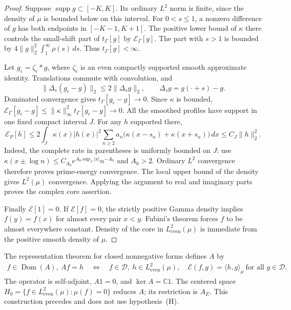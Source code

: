 \documentclass[11pt,a4paper]{article}
\numberwithin{equation}{section}
\theoremstyle{definition}
\theoremstyle{remark}
\newcommand{\C}{\mathbb C}
\newcommand{\E}{\mathcal E}
\newcommand{\D}{\mathcal D}
\newcommand{\He}{L^2_{\mathrm{even}}(\mu)}
\newcommand{\tg}{t_{\Gamma}}
\newcommand{\dom}{\operatorname{Dom}}
\newcommand{\supp}{\operatorname{supp}}
\newcommand{\ip}[2]{\langle #1,#2\rangle}
\newcommand{\norm}[1]{\lVert #1\rVert}
\begin{document}
\begin{proof}
Suppose $\supp g\subset[-K,K]$. Its ordinary $L^2$ norm is finite, since the density of $\mu$ is bounded below on this interval. For $0<s\le1$, a nonzero difference of $g$ has both endpoints in $[-K-1,K+1]$. The positive lower bound of $\kappa$ there controls the small-shift part of $\tg[g]$ by $\E_\Gamma[g]$. The part with $s>1$ is bounded by $4\norm{g}_2^2\int_1^\infty\rho(s)\,ds$. Thus $\tg[g]<\infty$.

Let $g_\epsilon=\zeta_\epsilon*g$, where $\zeta_\epsilon$ is an even compactly supported smooth approximate identity. Translations commute with convolution, and
\[
 \norm{\Delta_s(g_\epsilon-g)}_2\le2\norm{\Delta_sg}_2,
 \qquad\Delta_sg=g(\cdot+s)-g.
\]
Dominated convergence gives $\tg[g_\epsilon-g]\to0$. Since $\kappa$ is bounded,
$\E_\Gamma[g_\epsilon-g]\le\norm{\kappa}_\infty^2\tg[g_\epsilon-g]\to0$.
All the smoothed profiles have support in one fixed compact interval $J$. For any $h$ supported there,
\begin{equation}\label{eq:compactprimerate}
 \E_P[h]\le2\int_J\kappa(x)|h(x)|^2
     \sum_{n\ge2}a_n\bigl(\kappa(x-s_n)+\kappa(x+s_n)\bigr)\,dx
 \le C_J\norm{h}_2^2.
\end{equation}
Indeed, the complete rate in parentheses is uniformly bounded on $J$: use $\kappa(x\pm\log n)\le C_{A_0}e^{A_0\sup_J|x|}n^{-A_0}$ and $A_0>2$. Ordinary $L^2$ convergence therefore proves prime-energy convergence. The local upper bound of the density gives $L^2(\mu)$ convergence. Applying the argument to real and imaginary parts proves the complex core assertion.

Finally $\E[1]=0$. If $\E[f]=0$, the strictly positive Gamma density implies $f(y)=f(x)$ for almost every pair $x<y$. Fubini's theorem forces $f$ to be almost everywhere constant. Density of the core in $\He$ is immediate from the positive smooth density of $\mu$.
\end{proof}

The representation theorem for closed nonnegative forms \cite[Chapter~VI, Section~2]{Kato} defines $A$ by
\begin{equation}\label{eq:Adef}
 \begin{split}
 f\in\dom(A),\ Af=h\quad\Longleftrightarrow\quad
 f\in\D,\ h\in\He,\quad
 \E(f,g)=\ip{h}{g}_\mu\ \text{for all }g\in\D.
 \end{split}
\end{equation}
The operator is self-adjoint, $A1=0$, and $\ker A=\C1$. The centered space
$H_0=\{f\in\He:\mu(f)=0\}$ reduces $A$; its restriction is $A_E$. This construction precedes and does not use hypothesis~(H).
\end{document}
